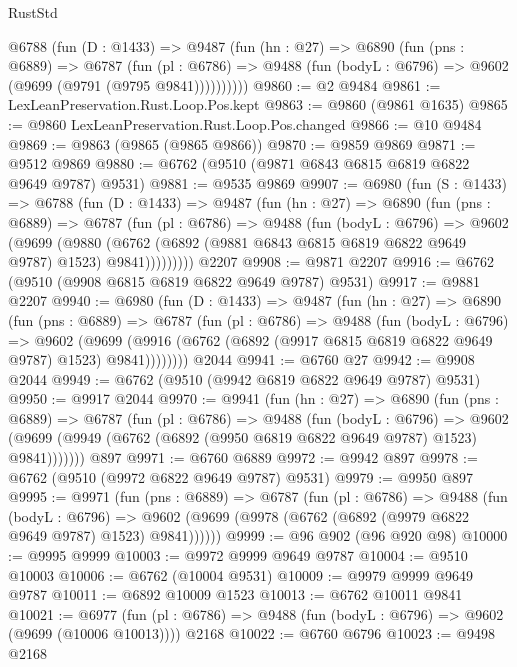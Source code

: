 \begin{lexlean}{RustStd}
\begin{coremodule}
      @6788
        (fun (D : @1433) =>
        @9487
          (fun (hn : @27) =>
          @6890
            (fun (pns : @6889) =>
            @6787
              (fun (pl : @6786) =>
              @9488 (fun (bodyL : @6796) => @9602 (@9699 (@9791 (@9795 @9841))))))))))
@9860 := @2 @9484
@9861 := LexLeanPreservation.Rust.Loop.Pos.kept
@9863 := @9860 (@9861 @1635)
@9865 := @9860 LexLeanPreservation.Rust.Loop.Pos.changed
@9866 := @10 @9484
@9869 := @9863 (@9865 (@9865 @9866))
@9870 := @9859 @9869
@9871 := @9512 @9869
@9880 := @6762 (@9510 (@9871 @6843 @6815 @6819 @6822 @9649 @9787) @9531)
@9881 := @9535 @9869
@9907 := @6980
    (fun (S : @1433) =>
    @6788
      (fun (D : @1433) =>
      @9487
        (fun (hn : @27) =>
        @6890
          (fun (pns : @6889) =>
          @6787
            (fun (pl : @6786) =>
            @9488
              (fun (bodyL : @6796) =>
              @9602
                (@9699
                  (@9880
                    (@6762 (@6892 (@9881 @6843 @6815 @6819 @6822 @9649 @9787) @1523) @9841)))))))))
    @2207
@9908 := @9871 @2207
@9916 := @6762 (@9510 (@9908 @6815 @6819 @6822 @9649 @9787) @9531)
@9917 := @9881 @2207
@9940 := @6980
    (fun (D : @1433) =>
    @9487
      (fun (hn : @27) =>
      @6890
        (fun (pns : @6889) =>
        @6787
          (fun (pl : @6786) =>
          @9488
            (fun (bodyL : @6796) =>
            @9602
              (@9699 (@9916 (@6762 (@6892 (@9917 @6815 @6819 @6822 @9649 @9787) @1523) @9841))))))))
    @2044
@9941 := @6760 @27
@9942 := @9908 @2044
@9949 := @6762 (@9510 (@9942 @6819 @6822 @9649 @9787) @9531)
@9950 := @9917 @2044
@9970 := @9941
    (fun (hn : @27) =>
    @6890
      (fun (pns : @6889) =>
      @6787
        (fun (pl : @6786) =>
        @9488
          (fun (bodyL : @6796) =>
          @9602 (@9699 (@9949 (@6762 (@6892 (@9950 @6819 @6822 @9649 @9787) @1523) @9841)))))))
    @897
@9971 := @6760 @6889
@9972 := @9942 @897
@9978 := @6762 (@9510 (@9972 @6822 @9649 @9787) @9531)
@9979 := @9950 @897
@9995 := @9971
    (fun (pns : @6889) =>
    @6787
      (fun (pl : @6786) =>
      @9488
        (fun (bodyL : @6796) =>
        @9602 (@9699 (@9978 (@6762 (@6892 (@9979 @6822 @9649 @9787) @1523) @9841))))))
@9999 := @96 @902 (@96 @920 @98)
@10000 := @9995 @9999
@10003 := @9972 @9999 @9649 @9787
@10004 := @9510 @10003
@10006 := @6762 (@10004 @9531)
@10009 := @9979 @9999 @9649 @9787
@10011 := @6892 @10009 @1523
@10013 := @6762 @10011 @9841
@10021 := @6977
    (fun (pl : @6786) => @9488 (fun (bodyL : @6796) => @9602 (@9699 (@10006 @10013))))
    @2168
@10022 := @6760 @6796
@10023 := @9498 @2168

\end{coremodule}
\end{lexlean}
